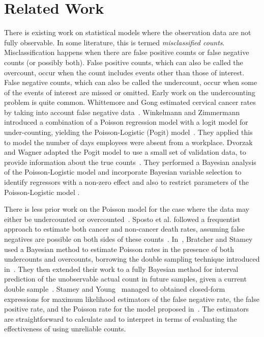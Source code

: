 
\section{Related Work}
\label{sec:related}

There is existing work on statistical models where the observation data are not fully observable. In some literature, this is termed \emph{misclassified counts}. Misclassification happens when there are false positive counts or false negative counts (or possibly both). False positive counts, which can also be called the overcount, occur when the count includes events other than those of interest. False negative counts, which can also be called the undercount, occur when some of the events of interest are missed or omitted. Early work on the undercounting problem is quite common. Whittemore and Gong estimated cervical cancer rates by taking into account false negative data~\cite{whittemore1991}. Winkelmann and Zimmermann introduced a combination of a Poisson regression model with a logit model for under-counting, yielding the Poisson-Logistic (Pogit) model~\cite{winkelmann1993poisson}. They applied this to model the number of days employees were absent from a workplace. Dvorzak and Wagner adapted the Pogit model to use a small set of validation data, to provide information about the true counts~\cite{dvorzak2016}. They performed a Bayesian analysis of the Poisson-Logistic model and incorporate Bayesian variable selection to identify regressors with a non-zero effect and also to restrict parameters of the Poisson-Logistic model .

There is less prior work on the Poisson model for the case where the data may either be undercounted or overcounted~\cite{sposto1992, bratcher2002, bratcher2004, stamey2005}. Sposto et al. followed a frequentist approach to estimate both cancer and non-cancer death rates, assuming false negatives are possible on both sides of these counts~\cite{sposto1992}. In~\cite{bratcher2002}, Bratcher and Stamey used a Bayesian method to estimate Poisson rates in the presence of both undercounts and overcounts, borrowing the double sampling technique introduced in~\cite{Tenenbein1970}. They then extended their work to a fully Bayesian method for interval prediction of the unobservable actual count in future samples, given a current double sample~\cite{bratcher2004}. Stamey and Young~\cite{stamey2005} managed to obtained closed-form expressions for maximum likelihood estimators of the false negative rate, the false positive rate, and the Poisson rate for the model proposed in~\cite{bratcher2002}. The estimators are straightforward to calculate and to interpret in terms of evaluating the effectiveness of using unreliable counts.

